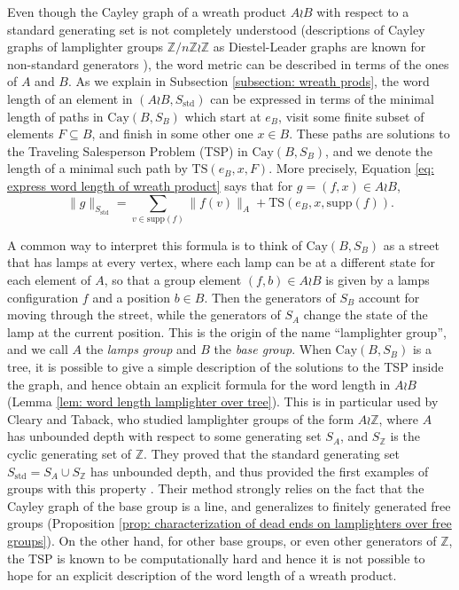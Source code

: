 \documentclass[reqno,oneside]{amsart}
\newcommand{\cay}[2]{\mathrm{Cay}(#1,#2)}
\newcommand{\Z}{\mathbb{Z}}
\newcommand{\supp}[1]{\mathrm{supp}(#1)}
\newcommand{\std}{S_{\mathrm{std}}}
\newcommand{\TS}[3]{\mathrm{TS}\left(#1,#2,#3\right)}
\theoremstyle{plain}
\theoremstyle{definition}
\begin{document}
Even though the Cayley graph of a wreath product $A\wr B$ with respect to a standard generating set is not completely understood (descriptions of Cayley graphs of lamplighter groups $\Z/n\Z \wr \Z$ as Diestel-Leader graphs are known for non-standard generators \cite{Woess2005}), the word metric can be described in terms of the ones of $A$ and $B$.  As we explain in Subsection \ref{subsection: wreath prods}, the word length of an element in $(A\wr B,\std)$ can be expressed in terms of the minimal length of paths in $\cay{B}{S_B}$ which start at $e_B$, visit some finite subset of elements $F\subseteq B$, and finish in some other one $x\in B$. These paths are solutions to the Traveling Salesperson Problem (TSP) in $\cay{B}{S_B}$, and we denote the length of a minimal such path by $\TS{e_B}{x}{F}$. More precisely, Equation \eqref{eq: express word length of wreath product} says that for $g=(f,x)\in A\wr B$,
$$
\|g\|_{\std}=\sum_{v\in \supp{f}}\|f(v)\|_{A} + \TS{e_B}{x}{\supp{f}}.
$$

A common way to interpret this formula is to think of $\cay{B}{S_B}$ as a street that has lamps at every vertex, where each lamp can be at a different state for each element of $A$, so that a group element $(f,b)\in A\wr B$ is given by a lamps configuration $f$ and a position $b\in B$. Then the generators of $S_B$ account for moving through the street, while the generators of $S_A$ change the state of the lamp at the current position. This is the origin of the name ``lamplighter group'', and we call $A$ the \textit{lamps group} and $B$ the \textit{base group}. When $\cay{B}{S_B}$ is a tree, it is possible to give a simple description of the solutions to the TSP inside the graph, and hence obtain an explicit formula for the word length in $A\wr B$  (Lemma \ref{lem: word length lamplighter over tree}). This is in particular used by Cleary and Taback, who studied lamplighter groups of the form $A\wr \Z$, where $A$ has unbounded depth with respect to some generating set $S_A$, and $S_{\Z}$ is the cyclic generating set of $\Z$. They proved that the standard generating set $\std=S_A\cup S_{\Z}$ has unbounded depth, and thus provided the first examples of groups with this property \cite{ClearyTaback05}. Their method strongly relies on the fact that the Cayley graph of the base group is a line, and generalizes to finitely generated free groups (Proposition \ref{prop: characterization of dead ends on lamplighters over free groups}). On the other hand, for other base groups, or even other generators of $\Z$, the TSP is known to be computationally hard and hence it is not possible to hope for an explicit description of the word length of a wreath product. 
\end{document}
